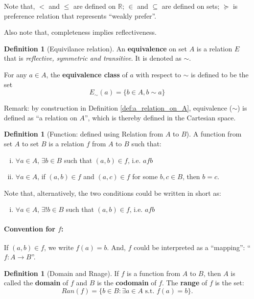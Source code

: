 \documentclass[12pt]{article}
\newcommand{\R}{{\mathbb R}}
\theoremstyle{definition}
\newtheorem{definition}[theorem]{Definition}
\theoremstyle{plain}
\begin{document}
Note that, $<$ and $\le$ are defined on $\R$; $\in$ and $\subseteq$ are 
defined on sets; $\succeq$ is preference relation that represents ``weakly 
prefer''.

Also note that, completeness implies reflectiveness.

\begin{definition}
    [Equivilance relation]

    An \textbf{equivalence} on set $A$ is a relation $E$ that is 
    \emph{reflective, symmetric and transitive}. It is denoted as $\sim$.

    For any $a \in A$, the \textbf{equivalence class} of $a$ with respect to 
    $\sim$ is defined to be the set 
    \[E_\sim(a) = \{ b \in A, b\sim a\}\]
\end{definition}

Remark: by construction in Definition \ref{def:a_relation_on_A},  equivalence 
($\sim$) is defined as ``a relation on $A$'', which is thereby defined in the 
Cartesian space.

\begin{definition}
    [Function: defined using Relation from $A$ to $B$]
    A function from set $A$ to set $B$ is a relation $f$ from $A$ to $B$ such 
    that: 
    \begin{enumerate}[(i)]
        \item $\forall a \in A$, $\exists b \in B$ such that $(a,b) \in f$, i.e. 
            $a f b$
        \item $\forall a \in A$, if $(a,b) \in f$ and $(a,c) \in f$ for some $b, 
            c \in B$, then $b = c$.
    \end{enumerate}

    Note that, alternatively, the two conditions could be written in short as: 
    \begin{enumerate}[(iii)]
        \item $\forall a \in A$, $\exists ! b \in B$ such that $(a,b) \in f$, i.e. 
            $a f b$
    \end{enumerate}

\end{definition}
\paragraph{Convention for $f$:} If $(a,b) \in f$, we write $f(a) = b$. And, $f$ 
could be interpreted as a ``mapping'': ``$f: A\to B$''.

\begin{definition}[Domain and Rnage]
    If $f$ is a function from $A$ to $B$, then $A$ is called the 
    \textbf{domain } of $f$ and $B$ is the \textbf{codomain} of $f$. The 
    \textbf{range} of $f$ is the set:
    \[
        Ran (f) = \{ b \in B: \exists a \in A 
        \text{ s.t. } f(a) = b\}.
    \]
\end{definition}
\end{document}
